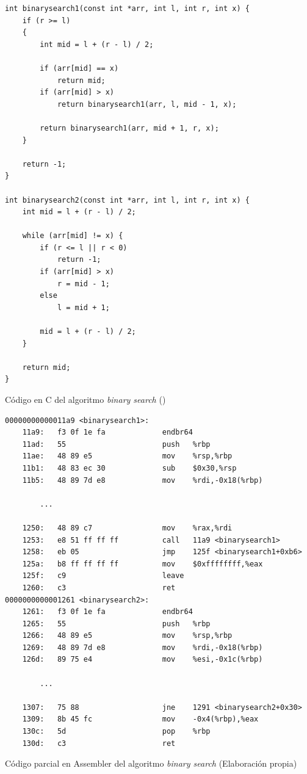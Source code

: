 \begin{mycode}
    \begin{verbatim}
int binarysearch1(const int *arr, int l, int r, int x) {
    if (r >= l)
    {
        int mid = l + (r - l) / 2;

        if (arr[mid] == x)
            return mid;
        if (arr[mid] > x)
            return binarysearch1(arr, l, mid - 1, x);

        return binarysearch1(arr, mid + 1, r, x);
    }

    return -1;
}

int binarysearch2(const int *arr, int l, int r, int x) {
    int mid = l + (r - l) / 2;

    while (arr[mid] != x) {
        if (r <= l || r < 0)
            return -1;
        if (arr[mid] > x)
            r = mid - 1;
        else
            l = mid + 1;

        mid = l + (r - l) / 2;
    }

    return mid;
}
    \end{verbatim}
    \caption[Código en C del algoritmo \textit{binary search}]{Código en C del algoritmo \textit{binary search} (\cite{BinarySearchGitHub})}
    \label{cod:binarySearchC}
\end{mycode}

\begin{mycode}
    \begin{verbatim}
00000000000011a9 <binarysearch1>:
    11a9:	f3 0f 1e fa          	endbr64
    11ad:	55                   	push   %rbp
    11ae:	48 89 e5             	mov    %rsp,%rbp
    11b1:	48 83 ec 30          	sub    $0x30,%rsp
    11b5:	48 89 7d e8          	mov    %rdi,-0x18(%rbp)
    
        ...

    1250:	48 89 c7             	mov    %rax,%rdi
    1253:	e8 51 ff ff ff       	call   11a9 <binarysearch1>
    1258:	eb 05                	jmp    125f <binarysearch1+0xb6>
    125a:	b8 ff ff ff ff       	mov    $0xffffffff,%eax
    125f:	c9                   	leave
    1260:	c3                   	ret
0000000000001261 <binarysearch2>:
    1261:	f3 0f 1e fa          	endbr64
    1265:	55                   	push   %rbp
    1266:	48 89 e5             	mov    %rsp,%rbp
    1269:	48 89 7d e8          	mov    %rdi,-0x18(%rbp)
    126d:	89 75 e4             	mov    %esi,-0x1c(%rbp)
    
        ...

    1307:	75 88                	jne    1291 <binarysearch2+0x30>
    1309:	8b 45 fc             	mov    -0x4(%rbp),%eax
    130c:	5d                   	pop    %rbp
    130d:	c3                   	ret
    \end{verbatim}
    \caption[Código parcial en Assembler del algoritmo \textit{binary search}]{Código parcial en Assembler del algoritmo \textit{binary search} (Elaboración propia)}
    \label{cod:binarySearchAsm_parcial}
\end{mycode}

